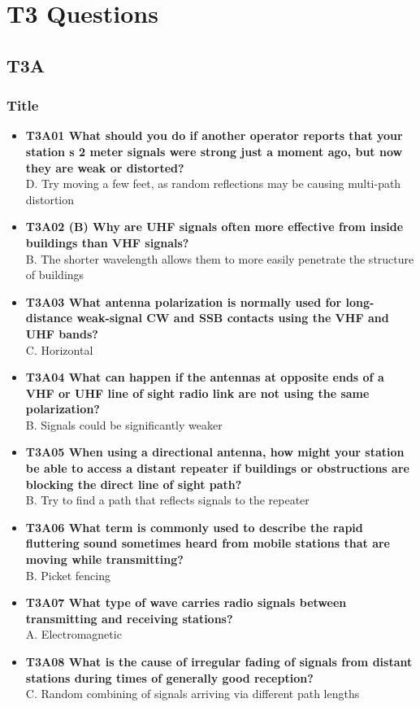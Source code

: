\documentclass[10pt]{beamer}
\begin{document}
\section{T3 Questions}
\subsection{T3A}
\begin{frame}
\frametitle{Title}
\begin{itemize}[<+->]
\tiny
\item\textbf{T3A01 What should you do if another operator reports that your station s 2 meter signals were strong just a moment ago, but now they are weak or distorted?}\\ D. Try moving a few feet, as random reflections may be causing multi-path distortion
\item\textbf{T3A02 (B) Why are UHF signals often more effective from inside buildings than VHF signals?}\\ B. The shorter wavelength allows them to more easily penetrate the structure of buildings
\item\textbf{T3A03 What antenna polarization is normally used for long-distance weak-signal CW and SSB contacts using the VHF and UHF bands?}\\ C. Horizontal
\item\textbf{T3A04 What can happen if the antennas at opposite ends of a VHF or UHF line of sight radio link are not using the same polarization?}\\ B. Signals could be significantly weaker
\item\textbf{T3A05 When using a directional antenna, how might your station be able to access a distant repeater if buildings or obstructions are blocking the direct line of sight path?}\\ B. Try to find a path that reflects signals to the repeater
\item\textbf{T3A06 What term is commonly used to describe the rapid fluttering sound sometimes heard from mobile stations that are moving while transmitting?}\\ B. Picket fencing
\item\textbf{T3A07 What type of wave carries radio signals between transmitting and receiving stations?}\\ A. Electromagnetic
\item\textbf{T3A08 What is the cause of irregular fading of signals from distant stations during times of generally good reception?}\\ C. Random combining of signals arriving via different path lengths

\end{itemize}
\end{frame}
\end{document}
